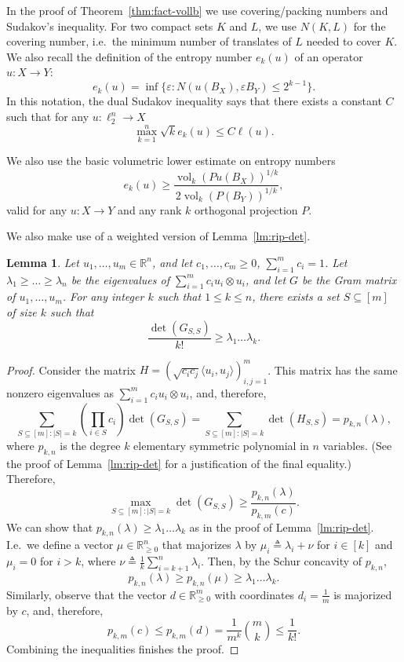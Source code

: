 \documentclass{article}
\newtheorem{lemma}{Lemma}
\newcommand{\R}{{\mathbb{R}}}
\newcommand{\eqdef}{\triangleq}
\DeclareMathOperator{\vol}{vol}
\begin{document}
In the proof of Theorem~\ref{thm:fact-vollb} we use covering/packing
numbers and Sudakov's inequality. For two compact sets $K$ and $L$, we
use $N(K,L)$ for the covering number, i.e.~the minimum number of translates of
$L$ needed to cover $K$. We also recall the definition of the entropy
number $e_k(u)$ of an operator $u:X \to Y$:
\[
e_k(u) = \inf\{\varepsilon: N(u(B_X), \varepsilon B_Y) \le 2^{k-1}\}. 
\]
In this notation, the dual Sudakov inequality says that there exists a
constant $C$ such that for any $u:\ell_2^n \to X$
\begin{equation}
  \label{eq:sudakov}
  \max_{k = 1}^n \sqrt{k}e_k(u) \le C\ell(u). 
\end{equation}

We also use the basic volumetric lower estimate on entropy numbers
\begin{equation}
  \label{eq:entropy-vol}
  e_k(u) \ge \frac{\vol_k(Pu(B_X))^{1/k}}{2\vol_k(P(B_Y))^{1/k}},
\end{equation}
valid for any $u:X \to Y$ and any rank $k$ orthogonal projection $P$.

We also make use of a weighted version of
Lemma~\ref{lm:rip-det}.  

\begin{lemma}\label{lm:rip-det-weighted}
  Let $u_1, \ldots, u_m \in \R^n$, and let $c_1, \ldots, c_m \ge 0$,
  $\sum_{i = 1}^mc_i = 1$. Let $\lambda_1 \ge \ldots \ge \lambda_n$ be
  the eigenvalues of $\sum_{i=1}^m{c_i u_i \otimes u_i}$, and let $G$
  be the Gram matrix of $u_1, \ldots, u_m$. For any
  integer $k$ such that $1 \le k \le n$, there exists a set $S
  \subseteq [m]$ of size $k$ such that 
  \[
  \frac{\det(G_{S,S})}{k!} \ge\lambda_1 \ldots \lambda_k. 
  \]
\end{lemma}
\begin{proof}
  Consider the matrix $H = (\sqrt{c_ic_j}\langle u_i, u_j
  \rangle)_{i,j = 1}^m$. This matrix has the same nonzero eigenvalues as
  $\sum_{i=1}^m{c_i u_i \otimes u_i}$, and, therefore,
  \[
  \sum_{S \subseteq [m]: |S| = k}{\left(\prod_{i \in S}{c_i}\right)\det(G_{S,S})}
  = \sum_{S \subseteq [m]: |S| = k}\det(H_{S,S}) = p_{k,n}(\lambda),
  \]
  where $p_{k,n}$ is the degree $k$ elementary symmetric polynomial in $n$
  variables. (See the proof of Lemma~\ref{lm:rip-det} for a
  justification of the final equality.) Therefore, 
  \[
  \max_{S \subseteq [m]: |S| = k}\det(G_{S,S}) 
  \ge \frac{p_{k,n}(\lambda)}{p_{k,m}(c)}. 
  \]
  We can show that $p_{k,n}(\lambda) \ge \lambda_1 \ldots \lambda_k$
  as in the proof of Lemma~\ref{lm:rip-det}. I.e.~we define a
  vector $\mu \in \R^n_{\ge 0}$ that majorizes $\lambda$ by $\mu_i
  \eqdef \lambda_i + \nu$ for $i \in [k]$ and $\mu_i = 0$ for $i > k$,
  where $\nu \eqdef \frac{1}{k}\sum_{i = k+1}^n{\lambda_i}$. Then, by
  the Schur concavity of $p_{k,n}$,
  \[
  p_{k,n}(\lambda) \ge p_{k,n}(\mu) \ge \lambda_1 \ldots \lambda_k.
  \]
  Similarly, observe that the vector $d \in \R^m_{\ge 0}$ with coordinates $d_i =
  \frac{1}{m}$ is majorized by $c$, and, therefore, 
  \[
  p_{k,m}(c) \le p_{k,m}(d) = \frac{1}{m^k} {m \choose k} \le \frac{1}{k!}.
  \]
  Combining the inequalities finishes the proof. 
\end{proof}
\end{document}
